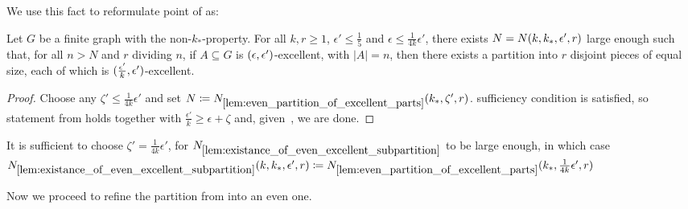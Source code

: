         We use this fact to reformulate point  of
         as:

        \begin{lemma} \label{lem:existance_of_even_excellent_subpartition}
            Let $G$ be a finite graph with the non-$k_*$-property.
            For all $k, r \geq 1$, $\epsilon' \leq \frac{1}{5}$ and $\epsilon \leq \frac{1}{4k} \epsilon'$, there exists
            $N = N( k, k_*, \epsilon', r )$ large enough such that, for all $n > N$ and $r$ dividing $n$,
            if $A \subseteq G$ is $( \epsilon, \epsilon' )$-excellent, with $|A| = n$, then there exists a
            partition into $r$ disjoint pieces of equal size, each of which is $( \frac{\epsilon'}{k}, \epsilon' )$-excellent.
            \begin{proof}
                Choose any $\zeta' \leq \frac{1}{4k} \epsilon'$ and set
                $N \coloneqq N_{\ref{lem:even_partition_of_excellent_parts}}( k_*, \zeta', r )$.
                 sufficiency condition is satisfied,
                so statement  from 
                holds together with $\frac{\epsilon'}{k} \geq \epsilon + \zeta$ and,
                given~, we are done.
            \end{proof}
        \end{lemma}

        \begin{remark}
            It is sufficient to choose $\zeta' = \frac{1}{4k} \epsilon'$, for $N_{\ref{lem:existance_of_even_excellent_subpartition}}$
            to be large enough, in which case
            $N_{\ref{lem:existance_of_even_excellent_subpartition}}( k, k_*, \epsilon', r ) \coloneqq
            N_{\ref{lem:even_partition_of_excellent_parts}}( k_*, \frac{1}{4k} \epsilon', r )$
        \end{remark}

        Now we proceed to refine the partition from  into an even one.

